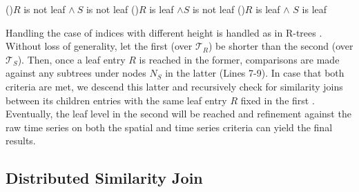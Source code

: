 \begin{algorithm}[!ht]
\begin{small}
	\DontPrintSemicolon
	\BlankLine
	\uIf(){$R$ is not leaf $\land \ S$ is not leaf}{
	}
	\uElseIf(){$R$ is leaf $\land S$ is not leaf}{
	}
	\uElseIf(){$R$ is leaf $\land$ $S$ is leaf }{
	}
	\caption{$SimJoinBTSR(R, S, \epsilon_{sp}, \epsilon_{ts})$}
	\label{alg:sim_joins_btsr}
\end{small}
\end{algorithm}


Handling the case of \btsr indices with different height is handled as in R-trees \cite{DBLP:conf/sigmod/BrinkhoffKS93}. Without loss of generality, let the first \btsr (over $\mathcal{T}_{R}$) be shorter than the second \btsr (over $\mathcal{T}_{S}$). Then, once a leaf entry $R$ is reached in the former, comparisons are made against any subtrees under nodes $N_S$ in the latter (Lines 7-9). In case that both criteria are met, we descend this latter \btsr and recursively check for similarity joins between its children entries with the same leaf entry $R$ fixed in the first \btsr. Eventually, the leaf level in the second \btsr will be reached and refinement against the raw time series on both the spatial and time series criteria can yield the final results.  

\subsection{Distributed Similarity Join}
\label{sec:distributed}

